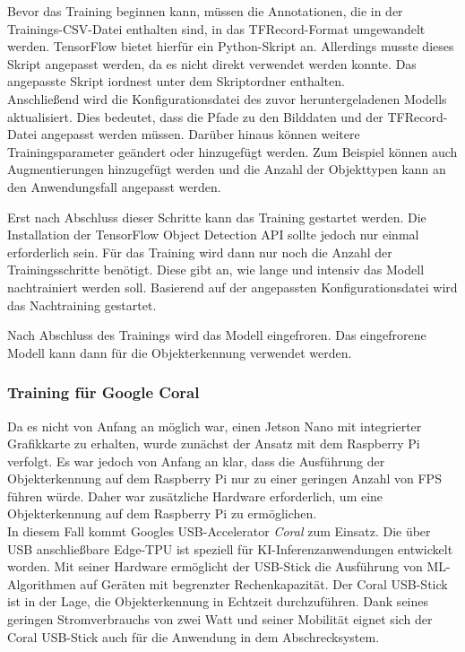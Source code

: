 Bevor das Training beginnen kann, müssen die Annotationen, die in der Trainings-CSV-Datei enthalten sind, in das TFRecord-Format umgewandelt werden. TensorFlow bietet hierfür ein Python-Skript an. Allerdings musste dieses Skript angepasst werden, da es nicht direkt verwendet werden konnte. Das angepasste Skript iordnest unter dem Skriptordner enthalten.\\
Anschließend wird die Konfigurationsdatei des zuvor heruntergeladenen Modells aktualisiert. Dies bedeutet, dass die Pfade zu den Bilddaten und der TFRecord-Datei angepasst werden müssen. Darüber hinaus können weitere Trainingsparameter geändert oder hinzugefügt werden. Zum Beispiel können auch Augmentierungen hinzugefügt werden und die Anzahl der Objekttypen kann an den Anwendungsfall angepasst werden.

Erst nach Abschluss dieser Schritte kann das Training gestartet werden. Die Installation der TensorFlow Object Detection API sollte jedoch nur einmal erforderlich sein. Für das Training wird dann nur noch die Anzahl der Trainingsschritte benötigt. Diese gibt an, wie lange und intensiv das Modell nachtrainiert werden soll. Basierend auf der angepassten Konfigurationsdatei wird das Nachtraining gestartet.

Nach Abschluss des Trainings wird das Modell eingefroren. Das eingefrorene Modell kann dann für die Objekterkennung verwendet werden.

\subsubsection{Training für Google Coral} \label{cap:coral_train}

Da es nicht von Anfang an möglich war, einen Jetson Nano mit integrierter Grafikkarte zu erhalten, wurde zunächst der Ansatz mit dem Raspberry Pi verfolgt. Es war jedoch von Anfang an klar, dass die Ausführung der Objekterkennung auf dem Raspberry Pi nur zu einer geringen Anzahl von FPS führen würde. Daher war zusätzliche Hardware erforderlich, um eine Objekterkennung auf dem Raspberry Pi zu ermöglichen.
\\
In diesem Fall kommt Googles USB-Accelerator \textit{Coral} zum Einsatz. Die über USB anschließbare Edge-TPU ist speziell für KI-Inferenzanwendungen entwickelt worden. Mit seiner Hardware ermöglicht der USB-Stick die Ausführung von \ac{ML}-Algorithmen auf Geräten mit begrenzter Rechenkapazität. Der Coral USB-Stick ist in der Lage, die Objekterkennung in Echtzeit durchzuführen. Dank seines geringen Stromverbrauchs von zwei Watt und seiner Mobilität eignet sich der Coral USB-Stick auch für die Anwendung in dem Abschrecksystem. \cite{coral_google}

